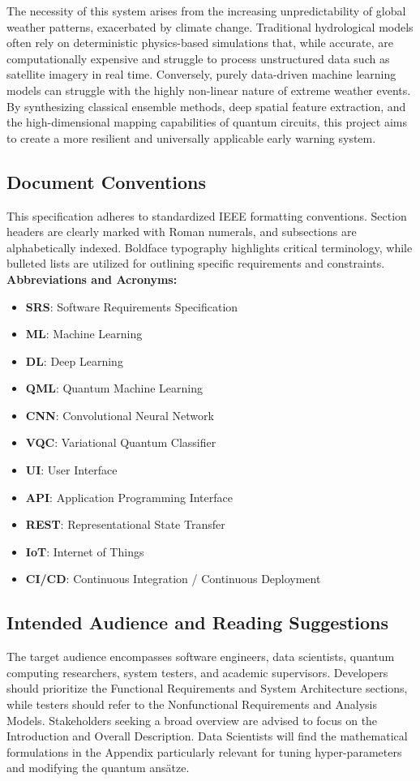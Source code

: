 \documentclass[conference]{IEEEtran}
\begin{document}
The necessity of this system arises from the increasing unpredictability of global weather patterns, exacerbated by climate change. Traditional hydrological models often rely on deterministic physics-based simulations that, while accurate, are computationally expensive and struggle to process unstructured data such as satellite imagery in real time. Conversely, purely data-driven machine learning models can struggle with the highly non-linear nature of extreme weather events. By synthesizing classical ensemble methods, deep spatial feature extraction, and the high-dimensional mapping capabilities of quantum circuits, this project aims to create a more resilient and universally applicable early warning system.

\subsection{Document Conventions}
This specification adheres to standardized IEEE formatting conventions. Section headers are clearly marked with Roman numerals, and subsections are alphabetically indexed. Boldface typography highlights critical terminology, while bulleted lists are utilized for outlining specific requirements and constraints. 
\textbf{Abbreviations and Acronyms:}
\begin{itemize}
    \item \textbf{SRS}: Software Requirements Specification
    \item \textbf{ML}: Machine Learning
    \item \textbf{DL}: Deep Learning
    \item \textbf{QML}: Quantum Machine Learning
    \item \textbf{CNN}: Convolutional Neural Network
    \item \textbf{VQC}: Variational Quantum Classifier
    \item \textbf{UI}: User Interface
    \item \textbf{API}: Application Programming Interface
    \item \textbf{REST}: Representational State Transfer
    \item \textbf{IoT}: Internet of Things
    \item \textbf{CI/CD}: Continuous Integration / Continuous Deployment
\end{itemize}

\subsection{Intended Audience and Reading Suggestions}
The target audience encompasses software engineers, data scientists, quantum computing researchers, system testers, and academic supervisors. Developers should prioritize the Functional Requirements and System Architecture sections, while testers should refer to the Nonfunctional Requirements and Analysis Models. Stakeholders seeking a broad overview are advised to focus on the Introduction and Overall Description. Data Scientists will find the mathematical formulations in the Appendix particularly relevant for tuning hyper-parameters and modifying the quantum ansätze.
\end{document}

